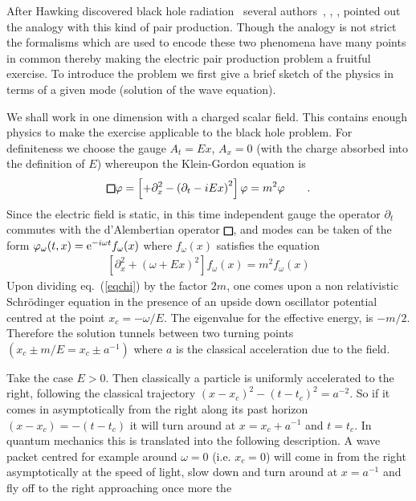 \documentclass[12pt,oneside]{report}
\def\sqr#1#2{{\vcenter{\vbox{\hrule height.#2pt
          \hbox{\vrule width.#2pt height#1pt \kern#1pt
           \vrule width.#2pt}
           \hrule height.#2pt}}}}
\def\square{\mathchoice\sqr68\sqr68\sqr{4.2}6\sqr{3}6}
\begin{document}
After Hawking discovered black hole radiation~\cite{Hawk} several
authors~\cite{Mul}, \cite{Step}, \cite{BPS}, \cite{PaBr0}
 pointed out the analogy with this kind of pair production.
Though the analogy is not strict the formalisms which
are used to encode these two phenomena have many points in 
common
thereby making the electric pair production problem a 
fruitful exercise.
 To introduce the problem we first give a brief
sketch of the physics in terms of a given mode (solution
of the wave equation).
\par We shall work in one dimension with a charged scalar field.
This contains enough physics to make the exercise applicable
to the black hole problem. For definiteness we choose the gauge
$A_t =  Ex$, $A_x = 0$ (with the charge absorbed into the definition of $E$)
whereupon the Klein-Gordon equation
is 
\begin{eqnarray}
 \square \varphi = \left[ + \partial^2_x - \left( \partial_t - i Ex
\right)^2 \right] \varphi = m^2 \varphi \qquad .\label{boxphi}
\end{eqnarray}
Since the electric field is static, in this time independent gauge the operator
$\partial_t$
commutes with the d'Alembertian operator $\square $, and modes can be taken of the
form $\varphi_{\omega}(t,x)={\rm e}^{-i \omega t} f_\omega(x)$ where $f_\omega(x)$
 satisfies the equation
\begin{eqnarray}
\left[ \partial^2_x + \left( \omega + Ex \right)^2
\right] f_\omega (x) = m^2 f_\omega (x) \label{eqchi}
\end{eqnarray}
Upon dividing eq.~(\ref{eqchi}) by the factor $2m$, one comes
upon a non relativistic Schr\"odinger equation in the
presence of an upside down oscillator potential centred at the
point $x_c = - \omega/E$.  The eigenvalue for the effective energy,
 is $-m/2$. Therefore the solution tunnels
between two turning points 
$\left(x_c \pm m/E =x_c \pm a^{-1}\right)$ where $a$ is the classical
acceleration due to the field.
\par Take the case $E > 0$.  Then classically a particle  is 
uniformly accelerated
to the right, following the classical trajectory $(x-x_c)^2-(t-t_c)^2=a^{-2}$. So if
it comes in asymptotically from the right along its past horizon $(x-x_c)=-(t-t_c)$
it will turn around at $x=x_c+a^{-1}$ and $t=t_c$.  In quantum
mechanics this is translated  into the following description.
A wave packet centred for example around $\omega = 0$ (i.e. $x_c=0$)
will come  in from the right
asymptotically at the speed of light, slow down and turn around at
$x = a^{-1}$ and fly off to the right approaching once  more the
\end{document}
